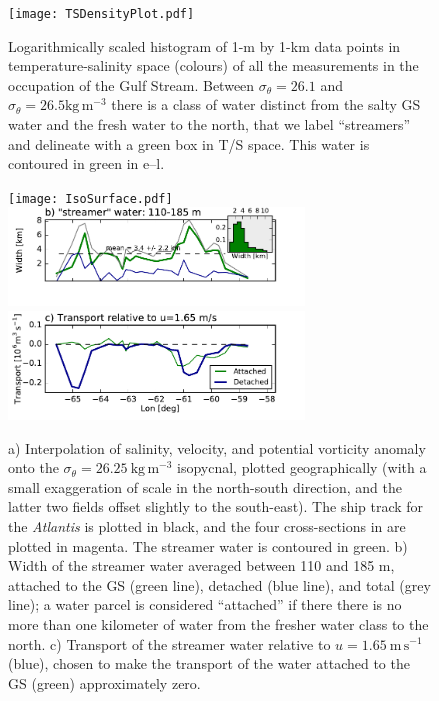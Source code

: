 \documentclass[draft,grl]{agutex2015}
\begin{document}
\begin{article}
\begin{figure}[htbp]
  \centering
    \texttt{[image: TSDensityPlot.pdf]}
    \caption{Logarithmically scaled histogram of 1-m by 1-km data points in temperature-salinity space (colours) of all the measurements in the occupation of the Gulf Stream.  Between $\sigma_{\theta}=26.1$ and $\sigma_{\theta}=26.5 \mathrm{kg\,m^{-3}}$ there is a class of water distinct from the salty GS water and the fresh water to the north, that we label ``streamers'' and delineate with a green box in T/S space.  This water is contoured in green in e--l.}\label{fig:TSDensityPlot}
\end{figure}

\begin{figure}[htbp]
  \centering
    \texttt{[image: IsoSurface.pdf]}
\includegraphics[width=0.7\textwidth,trim=0 25 0 0, clip]{FrontWidth.pdf}
\includegraphics[width=0.7\textwidth]{FrontTransport.pdf}
  \caption{a) Interpolation of salinity, velocity, and potential vorticity anomaly onto the $\sigma_{\theta}=26.25\ \mathrm{kg\,m^{-3}}$ isopycnal, plotted geographically (with a small exaggeration of scale in the north-south direction, and the latter two fields offset slightly to the south-east).  The ship track for the \emph{Atlantis} is plotted in black, and the four cross-sections in  are plotted in magenta.  The streamer water is contoured in green.  b) Width of the streamer water averaged between 110 and 185 m, attached to the GS (green line), detached (blue line), and total (grey line); a water parcel is considered ``attached'' if there there is no more than one kilometer of water from the fresher water class to the north.  
  c) Transport of the streamer water relative to $u=1.65\ \mathrm{m\,s^{-1}}$  (blue), chosen to make the transport of the water attached to the GS (green) approximately zero.
  } \label{fig:IsoSurface}
\end{figure}


\end{article}
\end{document}
